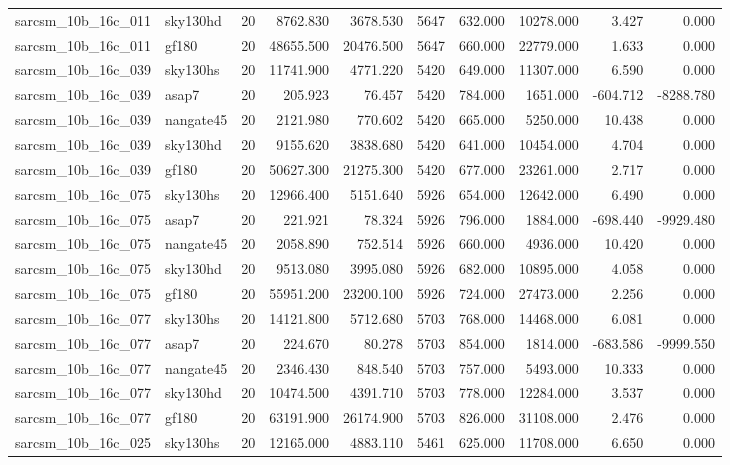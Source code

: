 \documentclass{article}
\begin{document}
\begin{longtable}{llrrrrrrrr}
sarcsm\_10b\_16c\_011 & sky130hd & 20 & 8762.830 & 3678.530 & 5647 & 632.000 & 10278.000 & 3.427 & 0.000 \\
sarcsm\_10b\_16c\_011 & gf180 & 20 & 48655.500 & 20476.500 & 5647 & 660.000 & 22779.000 & 1.633 & 0.000 \\
sarcsm\_10b\_16c\_039 & sky130hs & 20 & 11741.900 & 4771.220 & 5420 & 649.000 & 11307.000 & 6.590 & 0.000 \\
sarcsm\_10b\_16c\_039 & asap7 & 20 & 205.923 & 76.457 & 5420 & 784.000 & 1651.000 & -604.712 & -8288.780 \\
sarcsm\_10b\_16c\_039 & nangate45 & 20 & 2121.980 & 770.602 & 5420 & 665.000 & 5250.000 & 10.438 & 0.000 \\
sarcsm\_10b\_16c\_039 & sky130hd & 20 & 9155.620 & 3838.680 & 5420 & 641.000 & 10454.000 & 4.704 & 0.000 \\
sarcsm\_10b\_16c\_039 & gf180 & 20 & 50627.300 & 21275.300 & 5420 & 677.000 & 23261.000 & 2.717 & 0.000 \\
sarcsm\_10b\_16c\_075 & sky130hs & 20 & 12966.400 & 5151.640 & 5926 & 654.000 & 12642.000 & 6.490 & 0.000 \\
sarcsm\_10b\_16c\_075 & asap7 & 20 & 221.921 & 78.324 & 5926 & 796.000 & 1884.000 & -698.440 & -9929.480 \\
sarcsm\_10b\_16c\_075 & nangate45 & 20 & 2058.890 & 752.514 & 5926 & 660.000 & 4936.000 & 10.420 & 0.000 \\
sarcsm\_10b\_16c\_075 & sky130hd & 20 & 9513.080 & 3995.080 & 5926 & 682.000 & 10895.000 & 4.058 & 0.000 \\
sarcsm\_10b\_16c\_075 & gf180 & 20 & 55951.200 & 23200.100 & 5926 & 724.000 & 27473.000 & 2.256 & 0.000 \\
sarcsm\_10b\_16c\_077 & sky130hs & 20 & 14121.800 & 5712.680 & 5703 & 768.000 & 14468.000 & 6.081 & 0.000 \\
sarcsm\_10b\_16c\_077 & asap7 & 20 & 224.670 & 80.278 & 5703 & 854.000 & 1814.000 & -683.586 & -9999.550 \\
sarcsm\_10b\_16c\_077 & nangate45 & 20 & 2346.430 & 848.540 & 5703 & 757.000 & 5493.000 & 10.333 & 0.000 \\
sarcsm\_10b\_16c\_077 & sky130hd & 20 & 10474.500 & 4391.710 & 5703 & 778.000 & 12284.000 & 3.537 & 0.000 \\
sarcsm\_10b\_16c\_077 & gf180 & 20 & 63191.900 & 26174.900 & 5703 & 826.000 & 31108.000 & 2.476 & 0.000 \\
sarcsm\_10b\_16c\_025 & sky130hs & 20 & 12165.000 & 4883.110 & 5461 & 625.000 & 11708.000 & 6.650 & 0.000 \\

\end{longtable}
\end{document}
